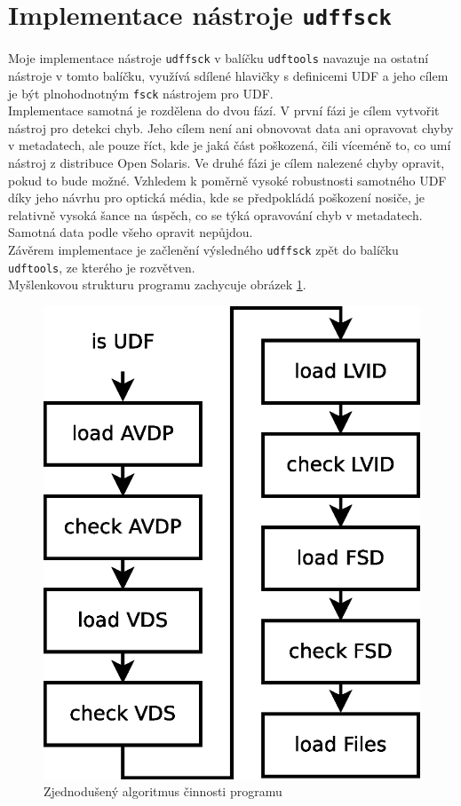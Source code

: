 \section{Implementace nástroje \texttt{udffsck}}
Moje implementace nástroje \texttt{udffsck} v balíčku \texttt{udftools} navazuje na ostatní nástroje v tomto balíčku, využívá sdílené hlavičky s definicemi UDF a jeho cílem je být plnohodnotným \texttt{fsck} nástrojem pro UDF.\\
Implementace samotná je rozdělena do dvou fází. V první fázi je cílem vytvořit nástroj pro detekci chyb. Jeho cílem není ani obnovovat data ani opravovat chyby v metadatech, ale pouze říct, kde je jaká část poškozená, čili víceméně to, co umí nástroj z distribuce Open Solaris. Ve druhé fázi je cílem nalezené chyby opravit, pokud to bude možné. Vzhledem k poměrně vysoké robustnosti samotného UDF díky jeho návrhu pro optická média, kde se předpokládá poškození nosiče, je relativně vysoká šance na úspěch, co se týká opravování chyb v metadatech. Samotná data podle všeho opravit nepůjdou.\\
Závěrem implementace je začlenění výsledného \texttt{udffsck} zpět do balíčku \texttt{udftools}, ze kterého je rozvětven.\\
Myšlenkovou strukturu programu zachycuje obrázek \ref{fig:steps1}. 
\begin{figure}[ht] 
    \centering
    \includegraphics[scale=0.4]{obrazky/steps1.eps}
    \caption{Zjednodušený algoritmus činnosti programu}
    \label{fig:steps1}
\end{figure}

